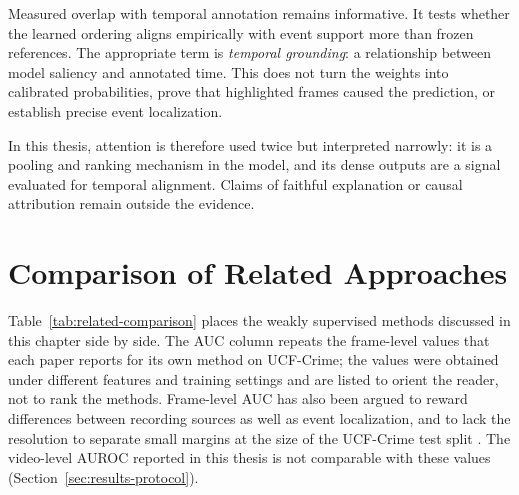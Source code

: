 Measured overlap with temporal annotation remains informative. It tests whether
the learned ordering aligns empirically with event support more than frozen
references. The appropriate term is \emph{temporal grounding}: a relationship
between model saliency and annotated time. This does not turn the weights into
calibrated probabilities, prove that highlighted frames caused the prediction,
or establish precise event localization.

In this thesis, attention is therefore used twice but interpreted narrowly: it
is a pooling and ranking mechanism in the model, and its dense outputs are a
signal evaluated for temporal alignment. Claims of faithful explanation or
causal attribution remain outside the evidence.

\section{Comparison of Related Approaches}
\label{sec:background-comparison}

Table~\ref{tab:related-comparison} places the weakly supervised methods
discussed in this chapter side by side. The AUC column repeats the frame-level
values that each paper reports for its own method on UCF-Crime; the values were
obtained under different features and training settings and are listed to
orient the reader, not to rank the methods. Frame-level AUC has also been argued
to reward differences between recording sources as well as event localization,
and to lack the resolution to separate small margins at the size of the
UCF-Crime test split \cite{abdulaziz2026auditing}. The video-level AUROC reported in this thesis is
not comparable with these values (Section~\ref{sec:results-protocol}).

